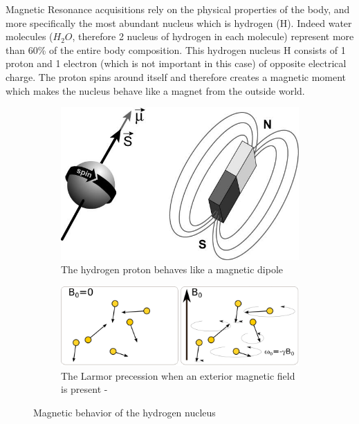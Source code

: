 Magnetic Resonance acquisitions rely on the physical properties of the body, and more specifically the most abundant nucleus which is hydrogen (H). Indeed water molecules ($H_2O$, therefore 2 nucleus of hydrogen in each molecule) represent more than 60\% of the entire body composition. This hydrogen nucleus H consists of 1 proton and 1 electron (which is not important in this case) of opposite electrical charge. The proton spins around itself and therefore creates a magnetic moment which makes the nucleus behave like a magnet from the outside world.
\begin{figure}
    \centering
    \begin{subfigure}{.28\textwidth}
        \includegraphics[width=\textwidth]{figures/hydrogen_magnet}
        \caption{The hydrogen proton behaves like a magnetic dipole}
        \label{fig:hydrogen_magnet}
    \end{subfigure}
    \hfill
    \begin{subfigure}{.68\textwidth}
        \includegraphics[width=\textwidth]{figures/Precession_Larmor_2}
        \caption{The Larmor precession when an exterior magnetic field is present - \cite{hydrogen}}
        \label{fig:larmor_precession}
    \end{subfigure}
    \caption{Magnetic behavior of the hydrogen nucleus}
    \label{fig:hydrogen}
\end{figure}

